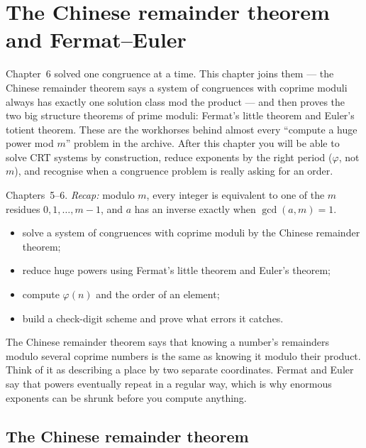 \chapter{The Chinese remainder theorem and Fermat--Euler}\label{ch:crt}

Chapter~6 solved one congruence at a time. This chapter joins them ---
the Chinese remainder theorem says a system of congruences with coprime
moduli always has exactly one solution class mod the product --- and then
proves the two big structure theorems of prime moduli: Fermat's little
theorem and Euler's totient theorem. These are the workhorses behind
almost every ``compute a huge power mod $m$'' problem in the archive.
After this chapter you will be able to solve CRT systems by construction,
reduce exponents by the right period ($\varphi$, not $m$), and recognise
when a congruence problem is really asking for an order.

\begin{rulebox}
Chapters~5--6. \emph{Recap:} modulo $m$, every integer is equivalent to one of the $m$ residues $0,1,\dots,m-1$, and $a$ has an inverse exactly when $\gcd(a,m)=1$.
\end{rulebox}
\begin{wins}
\begin{itemize}
\item solve a system of congruences with coprime moduli by the Chinese remainder theorem;
\item reduce huge powers using Fermat's little theorem and Euler's theorem;
\item compute $\varphi(n)$ and the order of an element;
\item build a check-digit scheme and prove what errors it catches.
\end{itemize}
\end{wins}
\begin{principle}
The Chinese remainder theorem says that knowing a number's remainders modulo several coprime numbers is the same as knowing it modulo their product. Think of it as describing a place by two separate coordinates. Fermat and Euler say that powers eventually repeat in a regular way, which is why enormous exponents can be shrunk before you compute anything.
\end{principle}

\section{The Chinese remainder theorem}\label{sec:crt}

